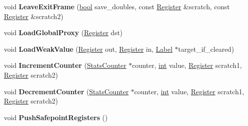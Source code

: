 \begin{DoxyCompactItemize}
\item 
\mbox{\label{classv8_1_1internal_1_1MacroAssembler_aa195763a4082c8fd3ec10c14e20b8f94}} 
void {\bfseries Leave\+Exit\+Frame} (\mbox{\hyperlink{classbool}{bool}} save\+\_\+doubles, const \mbox{\hyperlink{classv8_1_1internal_1_1Register}{Register}} \&scratch, const \mbox{\hyperlink{classv8_1_1internal_1_1Register}{Register}} \&scratch2)
\item 
\mbox{\label{classv8_1_1internal_1_1MacroAssembler_a8139c3ce1dd60f65909755011ef7f9d1}} 
void {\bfseries Load\+Global\+Proxy} (\mbox{\hyperlink{classv8_1_1internal_1_1Register}{Register}} dst)
\item 
\mbox{\label{classv8_1_1internal_1_1MacroAssembler_ab142a904bdb8e7d16e762655774c5284}} 
void {\bfseries Load\+Weak\+Value} (\mbox{\hyperlink{classv8_1_1internal_1_1Register}{Register}} out, \mbox{\hyperlink{classv8_1_1internal_1_1Register}{Register}} in, \mbox{\hyperlink{classv8_1_1internal_1_1Label}{Label}} $\ast$target\+\_\+if\+\_\+cleared)
\item 
\mbox{\label{classv8_1_1internal_1_1MacroAssembler_a7a18bd522429bd7c7f20cd2a4325249d}} 
void {\bfseries Increment\+Counter} (\mbox{\hyperlink{classv8_1_1internal_1_1StatsCounter}{Stats\+Counter}} $\ast$counter, \mbox{\hyperlink{classint}{int}} value, \mbox{\hyperlink{classv8_1_1internal_1_1Register}{Register}} scratch1, \mbox{\hyperlink{classv8_1_1internal_1_1Register}{Register}} scratch2)
\item 
\mbox{\label{classv8_1_1internal_1_1MacroAssembler_a989b426fe1ff4cb41c77b21f849fb370}} 
void {\bfseries Decrement\+Counter} (\mbox{\hyperlink{classv8_1_1internal_1_1StatsCounter}{Stats\+Counter}} $\ast$counter, \mbox{\hyperlink{classint}{int}} value, \mbox{\hyperlink{classv8_1_1internal_1_1Register}{Register}} scratch1, \mbox{\hyperlink{classv8_1_1internal_1_1Register}{Register}} scratch2)
\item 
\mbox{\label{classv8_1_1internal_1_1MacroAssembler_aca545d9193d7a468e285a5ba66fb6f19}} 
void {\bfseries Push\+Safepoint\+Registers} ()
\item 

\end{DoxyCompactItemize}
